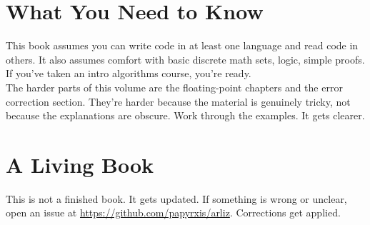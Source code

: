 \section*{What You Need to Know}

This book assumes you can write code in at least one language and read code in others. It also assumes comfort with basic discrete math sets, logic, simple proofs. If you've taken an intro algorithms course, you're ready.\\
The harder parts of this volume are the floating-point chapters and the error correction section. They're harder because the material is genuinely tricky, not because the explanations are obscure. Work through the examples. It gets clearer.

\section*{A Living Book}

This is not a finished book. It gets updated. If something is wrong or unclear, open an issue at \url{https://github.com/papyrxis/arliz}. Corrections get applied.

\vfill
\clearpage